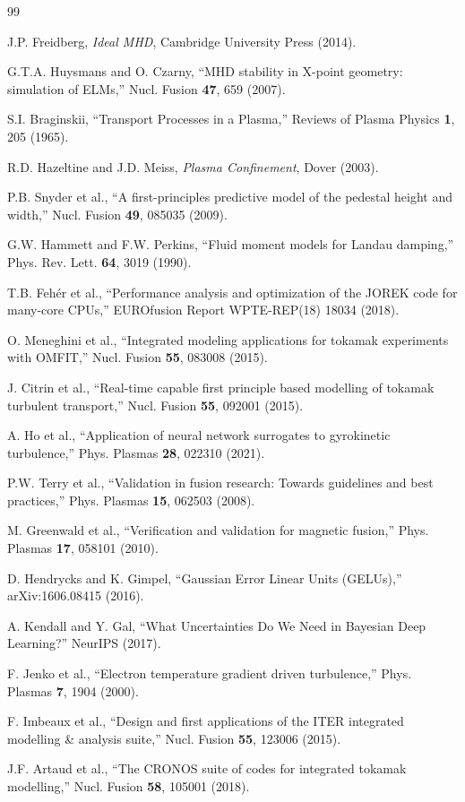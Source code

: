 \documentclass[12pt]{article}
\begin{document}
\begin{thebibliography}{99}

J.P. Freidberg, \textit{Ideal MHD}, Cambridge University Press (2014).

G.T.A. Huysmans and O. Czarny, ``MHD stability in X-point geometry: simulation of ELMs,'' Nucl. Fusion \textbf{47}, 659 (2007).

S.I. Braginskii, ``Transport Processes in a Plasma,'' Reviews of Plasma Physics \textbf{1}, 205 (1965).

R.D. Hazeltine and J.D. Meiss, \textit{Plasma Confinement}, Dover (2003).

P.B. Snyder et al., ``A first-principles predictive model of the pedestal height and width,'' Nucl. Fusion \textbf{49}, 085035 (2009).

G.W. Hammett and F.W. Perkins, ``Fluid moment models for Landau damping,'' Phys. Rev. Lett. \textbf{64}, 3019 (1990).

T.B. Fehér et al., ``Performance analysis and optimization of the JOREK code for many-core CPUs,'' EUROfusion Report WPTE-REP(18) 18034 (2018).

O. Meneghini et al., ``Integrated modeling applications for tokamak experiments with OMFIT,'' Nucl. Fusion \textbf{55}, 083008 (2015).

J. Citrin et al., ``Real-time capable first principle based modelling of tokamak turbulent transport,'' Nucl. Fusion \textbf{55}, 092001 (2015).

A. Ho et al., ``Application of neural network surrogates to gyrokinetic turbulence,'' Phys. Plasmas \textbf{28}, 022310 (2021).

P.W. Terry et al., ``Validation in fusion research: Towards guidelines and best practices,'' Phys. Plasmas \textbf{15}, 062503 (2008).

M. Greenwald et al., ``Verification and validation for magnetic fusion,'' Phys. Plasmas \textbf{17}, 058101 (2010).

D. Hendrycks and K. Gimpel, ``Gaussian Error Linear Units (GELUs),'' arXiv:1606.08415 (2016).

A. Kendall and Y. Gal, ``What Uncertainties Do We Need in Bayesian Deep Learning?'' NeurIPS (2017).

F. Jenko et al., ``Electron temperature gradient driven turbulence,'' Phys. Plasmas \textbf{7}, 1904 (2000).

F. Imbeaux et al., ``Design and first applications of the ITER integrated modelling \& analysis suite,'' Nucl. Fusion \textbf{55}, 123006 (2015).

J.F. Artaud et al., ``The CRONOS suite of codes for integrated tokamak modelling,'' Nucl. Fusion \textbf{58}, 105001 (2018).

\end{thebibliography}
\end{document}
